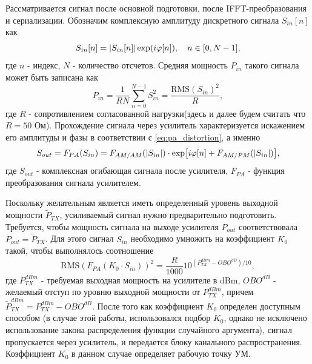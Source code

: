 Рассматривается сигнал после основной подготовки, после IFFT-преобразования
и сериализации. Обозначим комплексную амплитуду дискретного сигнала
$S_{in}[n]$ как
\begin{equation}
    S_{in}[n] = \abs{S_{in}[n]}\exp(i\varphi[n]),\quad n \in[0, N-1],
\end{equation}
где $n$ - индекс, $N$ - количество отсчетов. Средняя мощность
$P_{in}$ такого сигнала может быть записана как 
\begin{equation}
    P_{in} = \frac{1}{RN}\sum_{n=0}^{N-1}S^2_{in} = \frac{\text{RMS}(S_{in})^2}{R},
\end{equation}
где $R$ - сопротивлением согласованной нагрузки(здесь и далее будем считать
что $R=50$ Ом). Прохождение сигнала через усилитель характеризуется
искажением его амплитуды и фазы в соответствии с \ref{eq:pa_distortion}, а
именно
\begin{equation}
    S_{out} = F_{PA}(S_{in}) = F_{AM/AM}(\abs{S_{in}}) \cdot \exp[i \varphi[n] + F_{AM/PM}(\abs{S_{in}})],
\end{equation}
где $S_{out}$ - комплексная огибающая сигнала после усилителя, $F_{PA}$ -
функция преобразования сигнала усилителем.

Поскольку желательным является иметь определенный уровень
выходной мощности $\tilde{P}_{TX}$, усиливаемый сигнал нужно
предварительно подготовить. Требуется, чтобы мощность сигнала на выходе
усилителя $P_{out}$ соответствовала $P_{out} = \tilde{P}_{TX}$.
Для этого сигнал $S_{in}$ необходимо умножить на коэффициент $K_0$ такой,
чтобы выполнялось соотношение
\begin{equation}
    \displaystyle
    \text{RMS}(F_{PA}(K_0 \cdot S_{in}))^2 = \frac{R}{1000} 10^{\left(P^{dBm}_{TX} - OBO^{dB}\right)/10},
\end{equation}
где $P^{dBm}_{TX}$ - требуемая выходная мощность на усилителе в dBm,
$OBO^{dB}$ - желаемый отступ по уровню выходной мощности от $P^{dBm}_{TX}$,
причем $\tilde{P}^{dBm}_{TX} = P^{dBm}_{TX} - OBO^{dB}$.
После того как коэффициент $K_0$ определен доступным способом (в случае
этой работы, использовался подбор $K_0$, однако не исключено использование
закона распределения функции случайного аргумента), сигнал пропускается
через усилитель, и передается блоку канального распространения. Коэффициент
$K_0$ в данном случае определяет рабочую точку УМ.

